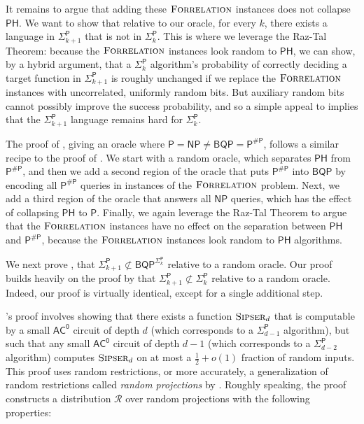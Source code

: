 \documentclass[11pt]{article}%
\newcommand{\Sipser}{\normalfont\textsc{Sipser}}
\newcommand{\Forrelation}{\normalfont\textsc{Forrelation}}
\begin{document}
It remains to argue that adding these $\Forrelation$ instances does not collapse $\mathsf{PH}$. We want to show that relative to our oracle, for every $k$, there exists a language in $\mathsf{\Sigma}_{k+1}^\mathsf{P}$ that is not in $\mathsf{\Sigma}_{k}^\mathsf{P}$. This is where we leverage the Raz-Tal Theorem: because the $\Forrelation$ instances look random to $\mathsf{PH}$, we can show, by a hybrid argument, that a $\mathsf{\Sigma}_{k}^\mathsf{P}$ algorithm's probability of correctly deciding a target function in $\mathsf{\Sigma}_{k+1}^\mathsf{P}$ is roughly unchanged if we replace the $\Forrelation$ instances with uncorrelated, uniformly random bits. But auxiliary random bits cannot possibly improve the success probability, and so a simple appeal to \cite{HRST17} implies that the $\mathsf{\Sigma}_{k+1}^\mathsf{P}$ language remains hard for $\mathsf{\Sigma}_{k}^\mathsf{P}$.

\bigskip

The proof of , giving an oracle where $\mathsf{P} = \mathsf{NP} \neq \mathsf{BQP} = \mathsf{P^{\# P}}$, follows a similar recipe to the proof of . We start with a random oracle, which separates $\mathsf{PH}$ from $\mathsf{P^{\# P}}$, and then we add a second region of the oracle that puts $\mathsf{P^{\# P}}$ into $\mathsf{BQP}$ by encoding all $\mathsf{P^{\# P}}$ queries in instances of the $\Forrelation$ problem. Next, we add a third region of the oracle that answers all $\mathsf{NP}$ queries, which has the effect of collapsing $\mathsf{PH}$ to $\mathsf{P}$. Finally, we again leverage the Raz-Tal Theorem to argue that the $\Forrelation$ instances have no effect on the separation between $\mathsf{PH}$ and $\mathsf{P^{\# P}}$, because the $\Forrelation$ instances look random to $\mathsf{PH}$ algorithms.

\bigskip

We next prove , that $\mathsf{\Sigma}_{k+1}^\mathsf{P} \not\subset \mathsf{BQP}^{\mathsf{\Sigma}_{k}^\mathsf{P}}$ relative to a random oracle. Our proof builds heavily on the proof by \cite{HRST17} that $\mathsf{\Sigma}_{k+1}^\mathsf{P} \not\subset \mathsf{\Sigma}_{k}^\mathsf{P}$ relative to a random oracle. Indeed, our proof is virtually identical, except for a single additional step.

\cite{HRST17}'s proof involves showing that there exists a function $\Sipser_{d}$ that is computable by a small $\mathsf{AC^0}$ circuit of depth $d$ (which corresponds to a $\mathsf{\Sigma}_{d-1}^\mathsf{P}$ algorithm), but such that any small $\mathsf{AC^0}$ circuit of depth $d-1$ (which corresponds to a $\mathsf{\Sigma}_{d-2}^\mathsf{P}$ algorithm) computes $\Sipser_{d}$ on at most a $\frac{1}{2} + o(1)$ fraction of random inputs. This proof uses random restrictions, or more accurately, a generalization of random restrictions called \textit{random projections} by \cite{HRST17}. Roughly speaking, the proof constructs a distribution $\mathcal{R}$ over random projections with the following properties:
\end{document}

